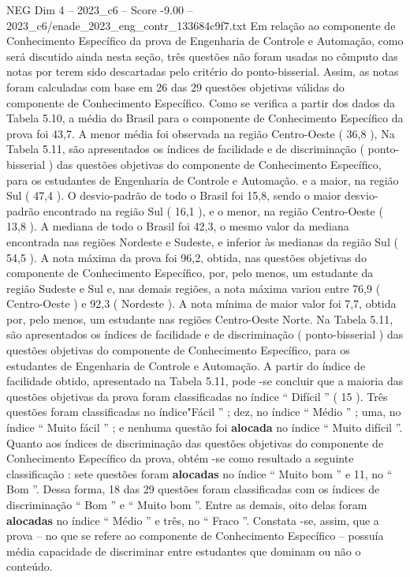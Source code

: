\begin{textsample}{NEG Dim 4 – 2023\_c6 – Score -9.00 – 2023\_c6/enade\_2023\_eng\_contr\_133684c9f7.txt}
Em relação ao componente de Conhecimento Específico da prova de Engenharia de Controle e Automação, como será discutido ainda nesta seção, três questões não foram usadas no cômputo das notas por terem sido descartadas pelo critério do ponto-bisserial.
Assim, as notas foram calculadas com base em 26 das 29 questões objetivas válidas do componente de Conhecimento Específico.
Como se verifica a partir dos dados da Tabela 5.10, a média do Brasil para o componente de Conhecimento Específico da prova foi 43,7.
A menor média foi observada na região Centro-Oeste ( 36,8 ), Na Tabela 5.11, são apresentados os índices de facilidade e de discriminação ( ponto-bisserial ) das questões objetivas do componente de Conhecimento Específico, para os estudantes de Engenharia de Controle e Automação. e a maior, na região Sul ( 47,4 ).
O desvio-padrão de todo o Brasil foi 15,8, sendo o maior desvio-padrão encontrado na região Sul ( 16,1 ), e o menor, na região Centro-Oeste ( 13,8 ).
A mediana de todo o Brasil foi 42,3, o mesmo valor da mediana encontrada nas regiões Nordeste e Sudeste, e inferior às medianas da região Sul ( 54,5 ).
A nota máxima da prova foi 96,2, obtida, nas questões objetivas do componente de Conhecimento Específico, por, pelo menos, um estudante da região Sudeste e Sul e, nas demais regiões, a nota máxima variou entre 76,9 ( Centro-Oeste ) e 92,3 ( Nordeste ).
A nota mínima de maior valor foi 7,7, obtida por, pelo menos, um estudante nas regiões Centro-Oeste Norte.
Na Tabela 5.11, são apresentados os índices de facilidade e de discriminação ( ponto-bisserial ) das questões objetivas do componente de Conhecimento Específico, para os estudantes de Engenharia de Controle e Automação.
A partir do índice de facilidade obtido, apresentado na Tabela 5.11, pode -se concluir que a maioria das questões objetivas da prova foram classificadas no índice “ Difícil ” ( 15 ).
Três questões foram classificadas no índice"Fácil ” ; dez, no índice “ Médio ” ; uma, no índice “ Muito fácil ” ; e nenhuma questão foi \textbf{alocada} no índice “ Muito difícil ”.
Quanto aos índices de discriminação das questões objetivas do componente de Conhecimento Específico da prova, obtém -se como resultado a seguinte classificação : sete questões foram \textbf{alocadas} no índice “ Muito bom ” e 11, no “ Bom ”.
Dessa forma, 18 das 29 questões foram classificadas com os índices de discriminação “ Bom ” e “ Muito bom ”.
Entre as demais, oito delas foram \textbf{alocadas} no índice “ Médio ” e três, no “ Fraco ”.
Constata -se, assim, que a prova – no que se refere ao componente de Conhecimento Específico – possuía média capacidade de discriminar entre estudantes que dominam ou não o conteúdo.

\end{textsample}
